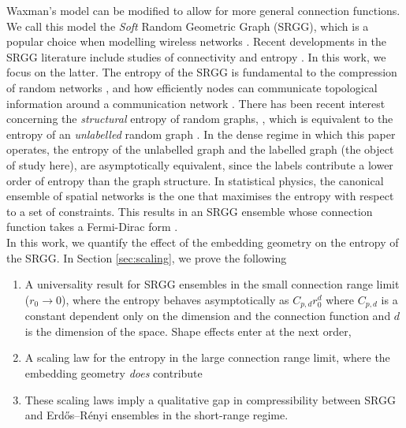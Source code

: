 \documentclass{article}
\begin{document}
Waxman's model can be modified to allow for more general connection functions. We call this model the \textit{Soft} Random Geometric Graph (SRGG), which is a popular choice when modelling wireless networks \cite{haenggi2009stochastic}. Recent developments in the SRGG literature include studies of connectivity \cite{penrose2016connectivity, dettmann2016random} and entropy \cite{coon2018entropy,vippathalla2024lossy,baker2025entropy}. In this work, we focus on the latter. The entropy of the SRGG is fundamental to the compression of random networks \cite{vippathalla2024lossy}, and how efficiently nodes can communicate topological information around a communication network \cite{an2002entropy, coon2016topological}. There has been recent interest concerning the \textit{structural} entropy of random graphs, \cite{compression_choi_2012,asymmetry_uczak_2019,structural_badiu_2021}, which is equivalent to the entropy of an \textit{unlabelled} random graph \cite{paton2022entropy}. In the dense regime in which this paper operates, the entropy of the unlabelled graph and the labelled graph (the object of study here), are asymptotically equivalent, since the labels contribute a lower order of entropy than the graph structure. In statistical physics, the canonical ensemble of spatial networks is the one that maximises the entropy with respect to a set of constraints. This results in an SRGG ensemble whose connection function takes a Fermi-Dirac form \cite{bianconi2021information, krioukov2016clustering, coon2018entropy}. \\

In this work, we quantify the effect of the embedding geometry on the entropy of the SRGG. In Section \ref{sec:scaling}, we prove the following
\begin{enumerate}
    \item A universality result for SRGG ensembles in the small connection range limit ($r_0 \to 0$), where the entropy behaves asymptotically as $C_{p,d}r_0^d$ where $C_{p,d}$ is a constant dependent only on the dimension and the connection function and $d$ is the dimension of the space. Shape effects enter at the next order,
    \item A scaling law for the entropy in the large connection range limit, where the embedding geometry \textit{does} contribute
    \item These scaling laws imply a qualitative gap in compressibility between SRGG and Erd\H os–R\'enyi ensembles in the short-range regime.
\end{enumerate}
\end{document}
